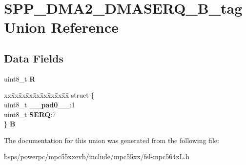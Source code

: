 \hypertarget{unionSPP__DMA2__DMASERQ__8B__tag}{}\section{S\+P\+P\+\_\+\+D\+M\+A2\+\_\+\+D\+M\+A\+S\+E\+R\+Q\+\_\+B\+\_\+tag Union Reference}
\label{unionSPP__DMA2__DMASERQ__8B__tag}
\subsection*{Data Fields}
\begin{DoxyCompactItemize}
\item 
\mbox{\label{unionSPP__DMA2__DMASERQ__8B__tag_a42e738ed9c65f07314573a27b830b4c9}} 
uint8\+\_\+t {\bfseries R}
\item 
\mbox{\label{unionSPP__DMA2__DMASERQ__8B__tag_a7339ecd827c57e5ac30718a876ebefdd}} 
\begin{tabbing}
xx\=xx\=xx\=xx\=xx\=xx\=xx\=xx\=xx\=\kill
struct \{\\
\>uint8\_t {\bfseries \_\_pad0\_\_}:1\\
\>uint8\_t {\bfseries SERQ}:7\\
\} {\bfseries B}\\

\end{tabbing}\end{DoxyCompactItemize}


The documentation for this union was generated from the following file\+:\begin{DoxyCompactItemize}
\item 
bsps/powerpc/mpc55xxevb/include/mpc55xx/fsl-\/mpc564x\+L.\+h\end{DoxyCompactItemize}
